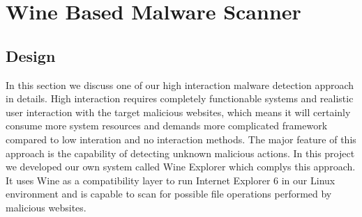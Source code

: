 \section{Wine Based Malware Scanner}
\subsection{Design}
In this section we discuss one of our high interaction malware detection 
approach in details. High interaction requires completely functionable systems 
and realistic user interaction with the target malicious websites, which means 
it will certainly consume more system resources and demands more complicated 
framework compared to low interation and no interaction methods. The major 
feature of this approach is the capability of detecting unknown malicious 
actions. In this project we developed our own system called Wine Explorer 
which complys this approach. It uses Wine as a compatibility layer to run 
Internet Explorer 6 in our Linux environment and is capable to scan for 
possible file operations performed by malicious websites. 

